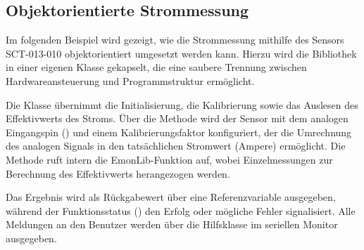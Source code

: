 	
	{
	}
	
\subsection{Objektorientierte Strommessung}

	Im folgenden Beispiel wird gezeigt, wie die Strommessung mithilfe des Sensors SCT-013-010 objektorientiert umgesetzt werden kann. Hierzu wird die Bibliothek  in einer eigenen Klasse  gekapselt, die eine saubere Trennung zwischen Hardwareansteuerung und Programmstruktur ermöglicht. 
	
	Die Klasse übernimmt die Initialisierung, die Kalibrierung sowie das Auslesen des Effektivwerts des Stroms. 
	Über die Methode  wird der Sensor mit dem analogen Eingangspin () und einem Kalibrierungsfaktor  konfiguriert, 
	der die Umrechnung des analogen Signals in den tatsächlichen Stromwert (Ampere) ermöglicht. 
	Die Methode  ruft intern die EmonLib-Funktion  auf, 
	wobei  Einzelmessungen zur Berechnung des Effektivwerts herangezogen werden. 
	
	Das Ergebnis wird als Rückgabewert über eine Referenzvariable ausgegeben, während der Funktionsstatus () den Erfolg oder mögliche Fehler signalisiert. Alle Meldungen an den Benutzer werden über die Hilfsklasse  im seriellen Monitor ausgegeben. 
	
	{
	}
	
	{
	}
	
	{
	}
	
	{
	}
	
	{
	}
	
